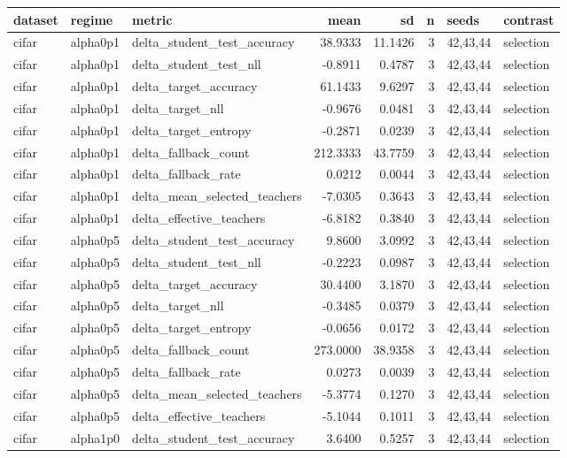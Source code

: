 \begin{tabular}{lllrrrll}
\toprule
dataset & regime & metric & mean & sd & n & seeds & contrast \\
\midrule
cifar & alpha0p1 & delta\_student\_test\_accuracy & 38.9333 & 11.1426 & 3 & 42,43,44 & selection \\
cifar & alpha0p1 & delta\_student\_test\_nll & -0.8911 & 0.4787 & 3 & 42,43,44 & selection \\
cifar & alpha0p1 & delta\_target\_accuracy & 61.1433 & 9.6297 & 3 & 42,43,44 & selection \\
cifar & alpha0p1 & delta\_target\_nll & -0.9676 & 0.0481 & 3 & 42,43,44 & selection \\
cifar & alpha0p1 & delta\_target\_entropy & -0.2871 & 0.0239 & 3 & 42,43,44 & selection \\
cifar & alpha0p1 & delta\_fallback\_count & 212.3333 & 43.7759 & 3 & 42,43,44 & selection \\
cifar & alpha0p1 & delta\_fallback\_rate & 0.0212 & 0.0044 & 3 & 42,43,44 & selection \\
cifar & alpha0p1 & delta\_mean\_selected\_teachers & -7.0305 & 0.3643 & 3 & 42,43,44 & selection \\
cifar & alpha0p1 & delta\_effective\_teachers & -6.8182 & 0.3840 & 3 & 42,43,44 & selection \\
cifar & alpha0p5 & delta\_student\_test\_accuracy & 9.8600 & 3.0992 & 3 & 42,43,44 & selection \\
cifar & alpha0p5 & delta\_student\_test\_nll & -0.2223 & 0.0987 & 3 & 42,43,44 & selection \\
cifar & alpha0p5 & delta\_target\_accuracy & 30.4400 & 3.1870 & 3 & 42,43,44 & selection \\
cifar & alpha0p5 & delta\_target\_nll & -0.3485 & 0.0379 & 3 & 42,43,44 & selection \\
cifar & alpha0p5 & delta\_target\_entropy & -0.0656 & 0.0172 & 3 & 42,43,44 & selection \\
cifar & alpha0p5 & delta\_fallback\_count & 273.0000 & 38.9358 & 3 & 42,43,44 & selection \\
cifar & alpha0p5 & delta\_fallback\_rate & 0.0273 & 0.0039 & 3 & 42,43,44 & selection \\
cifar & alpha0p5 & delta\_mean\_selected\_teachers & -5.3774 & 0.1270 & 3 & 42,43,44 & selection \\
cifar & alpha0p5 & delta\_effective\_teachers & -5.1044 & 0.1011 & 3 & 42,43,44 & selection \\
cifar & alpha1p0 & delta\_student\_test\_accuracy & 3.6400 & 0.5257 & 3 & 42,43,44 & selection \\

\end{tabular}
